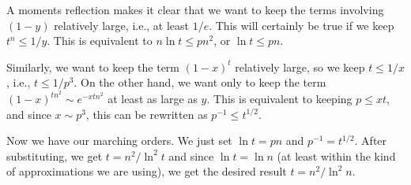 A moments reflection makes it clear that
we want to keep the terms involving
$(1-y)$ relatively large, i.e.,
at least $1/e$.  This will certainly be true if
we keep  $t^n\le 1/y$. This is equivalent
to $n\ln t\le pn^2$, or $\ln t\le pn$.

Similarly, we want to keep the term $(1-x)^{t}$ relatively large,
so we keep $t\le 1/x$, i.e., $t\le 1/p^3$.  On the other hand,
we want only to keep the term $(1-x)^{tn^2}\sim e^{-xtn^2}$ at least as large
as $y$.  This is equivalent to keeping
$p\le xt$, and since $x\sim p^3$, this can be rewritten as $p^{-1}\le t^{1/2}$.  

Now we have our marching orders.  We just set $\ln t=pn$ and
$p^{-1}=t^{1/2}$.  After substituting, we get $t= n^2/\ln^2t$ and
since $\ln t=\ln n$ (at least within the kind of approximations we
are using), we get the desired result $t=n^2/\ln^2n$.


